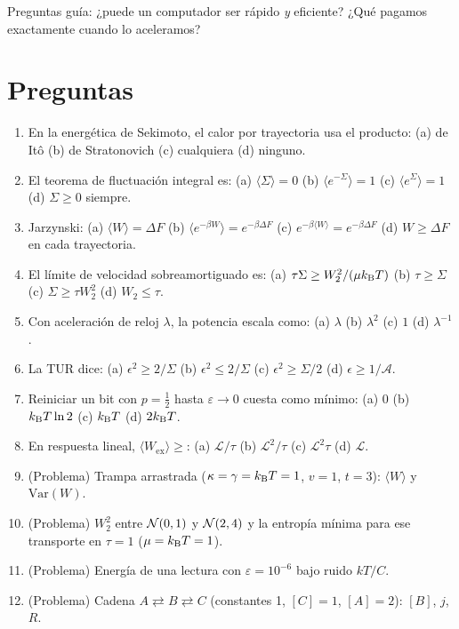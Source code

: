 \documentclass[11pt,a4paper]{article}
\begin{document}
\noindent Preguntas guía: ¿puede un computador ser rápido \emph{y} eficiente? ¿Qué pagamos exactamente cuando lo aceleramos?
\section*{Preguntas}
\begin{enumerate}
\item En la energética de Sekimoto, el calor por trayectoria usa el producto: (a) de Itô (b) de Stratonovich (c) cualquiera (d) ninguno.
\item El teorema de fluctuación integral es: (a) $\langle\Sigma\rangle=0$ (b) $\langle e^{-\Sigma}\rangle=1$ (c) $\langle e^{\Sigma}\rangle=1$ (d) $\Sigma\ge0$ siempre.
\item Jarzynski: (a) $\langle W\rangle=\Delta F$ (b) $\langle e^{-\beta W}\rangle=e^{-\beta\Delta F}$ (c) $e^{-\beta\langle W\rangle}=e^{-\beta\Delta F}$ (d) $W\ge\Delta F$ en cada trayectoria.
\item El límite de velocidad sobreamortiguado es: (a) $\tau\Sigma\ge W_2^2/(\mu k_{\mathrm B} T)$ (b) $\tau\ge\Sigma$ (c) $\Sigma\ge\tau W_2^2$ (d) $W_2\le\tau$.
\item Con aceleración de reloj $\lambda$, la potencia escala como: (a) $\lambda$ (b) $\lambda^2$ (c) $1$ (d) $\lambda^{-1}$.
\item La TUR dice: (a) $\epsilon^2\ge2/\Sigma$ (b) $\epsilon^2\le2/\Sigma$ (c) $\epsilon^2\ge\Sigma/2$ (d) $\epsilon\ge1/\mathcal A$.
\item Reiniciar un bit con $p=\tfrac12$ hasta $\varepsilon\to0$ cuesta como mínimo: (a) 0 (b) $k_{\mathrm B} T\ln2$ (c) $k_{\mathrm B} T$ (d) $2k_{\mathrm B} T$.
\item En respuesta lineal, $\langle W_{\text{ex}}\rangle\ge$: (a) $\mathcal L/\tau$ (b) $\mathcal L^2/\tau$ (c) $\mathcal L^2\tau$ (d) $\mathcal L$.
\item (Problema) Trampa arrastrada ($\kappa=\gamma=k_{\mathrm B} T=1$, $v=1$, $t=3$): $\langle W\rangle$ y $\mathrm{Var}(W)$.
\item (Problema) $W_2^2$ entre $\mathcal{N}(0,1)$ y $\mathcal{N}(2,4)$ y la entropía mínima para ese transporte en $\tau=1$ ($\mu=k_{\mathrm B} T=1$).
\item (Problema) Energía de una lectura con $\varepsilon=10^{-6}$ bajo ruido $kT/C$.
\item (Problema) Cadena $A\rightleftarrows B\rightleftarrows C$ (constantes 1, $[C]=1$, $[A]=2$): $[B]$, $j$, $R$.
\end{enumerate}
\newpage
\end{document}

